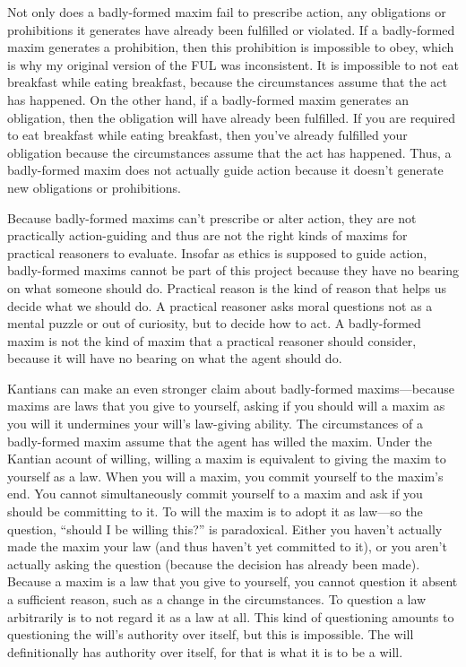 \begin{isabellebody}
\begin{isamarkuptext}
Not only does a badly-formed maxim fail to prescribe action, any obligations or prohibitions it 
generates have already been fulfilled or violated. If a badly-formed maxim generates a prohibition, 
then this prohibition is impossible to obey, which is why my original version of the FUL was inconsistent. 
It is impossible to not eat breakfast while eating breakfast, because the circumstances assume that the 
act has happened. On the other hand, if a badly-formed maxim generates an obligation, then the obligation 
will have already been fulfilled. If you are required to eat breakfast while eating breakfast, then you've 
already fulfilled your obligation because the circumstances assume that the act has happened. Thus, 
a badly-formed maxim does not actually guide action because it doesn't generate new obligations or 
prohibitions. 

Because badly-formed maxims can't prescribe or alter action, they are not practically action-guiding and 
thus are not the right kinds of maxims for practical reasoners to evaluate. Insofar as ethics 
is supposed to guide action, badly-formed maxims cannot be part of this project because they
have no bearing on what someone should do. Practical reason is the kind of reason that helps us decide 
what we should do. A practical reasoner asks moral questions not as a mental puzzle or out of curiosity, but 
to decide how to act. A badly-formed maxim is not the kind of maxim that a practical reasoner should consider, because it
will have no bearing on what the agent should do.

Kantians can make an even stronger claim about badly-formed maxims—because maxims are laws that you 
give to yourself, asking if you should will a maxim as you will it undermines your will's law-giving 
ability. The circumstances of a badly-formed maxim assume that the agent has willed the maxim. Under 
the Kantian acount of willing, willing a maxim is equivalent to giving the maxim to yourself as a law. 
When you will a maxim, you commit yourself to the maxim's end. You cannot simultaneously 
commit yourself to a maxim and ask if you should be committing to it. To will the maxim is to adopt it as 
law—so the question, ``should I be willing this?'' is paradoxical. Either you haven't actually made 
the maxim your law (and thus haven't yet committed to it), or you aren't actually asking 
the question (because the decision has already been made). Because a maxim is a law that you give to 
yourself, you cannot question it absent a sufficient reason, such as a change in the circumstances. 
To question a law arbitrarily is to not regard it as a law at all. This kind of questioning amounts to 
questioning the will's authority over itself, but this is impossible. The will definitionally has authority 
over itself, for that is what it is to be a will. 


\end{isamarkuptext}
\end{isabellebody}
